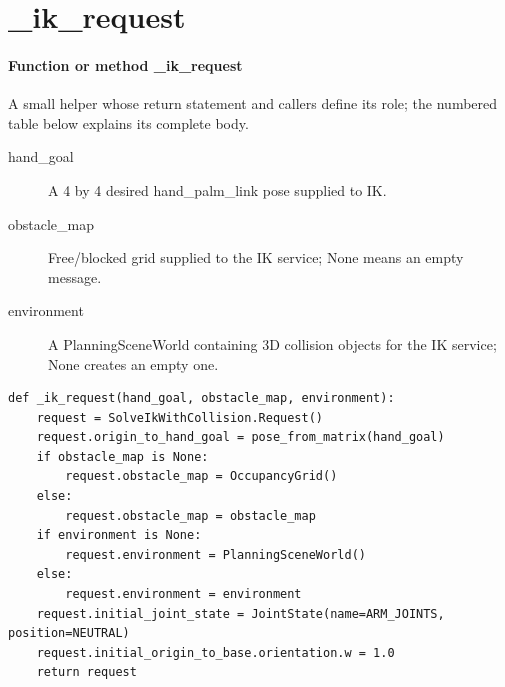 \documentclass[11pt,a4paper]{book}
\begin{document}
\section{\_ik\_request}

\paragraph{Function or method \_ik\_request}
A small helper whose return statement and callers define its role; the numbered table below explains its complete body.

\begin{description}
\item[hand\_goal] A 4 by 4 desired hand\_palm\_link pose supplied to IK.
\item[obstacle\_map] Free/blocked grid supplied to the IK service; None means an empty message.
\item[environment] A PlanningSceneWorld containing 3D collision objects for the IK service; None creates an empty one.
\end{description}

\begin{lstlisting}[firstnumber=171]
def _ik_request(hand_goal, obstacle_map, environment):
    request = SolveIkWithCollision.Request()
    request.origin_to_hand_goal = pose_from_matrix(hand_goal)
    if obstacle_map is None:
        request.obstacle_map = OccupancyGrid()
    else:
        request.obstacle_map = obstacle_map
    if environment is None:
        request.environment = PlanningSceneWorld()
    else:
        request.environment = environment
    request.initial_joint_state = JointState(name=ARM_JOINTS, position=NEUTRAL)
    request.initial_origin_to_base.orientation.w = 1.0
    return request


\end{lstlisting}
\end{document}
